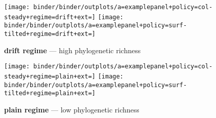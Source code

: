 
\begin{figure*}
  \centering

\begin{subfigure}[b]{\textwidth}
\centering
\texttt{[image: binder/binder/outplots/a=examplepanel+policy=col-steady+regime=drift+ext=]}%
\texttt{[image: binder/binder/outplots/a=examplepanel+policy=surf-tilted+regime=drift+ext=]}
\caption{\textbf{drift regime} --- high phylogenetic richness}
\label{fig:examplepanel-drift}
\end{subfigure}

\begin{subfigure}[b]{\textwidth}
\centering
\texttt{[image: binder/binder/outplots/a=examplepanel+policy=col-steady+regime=plain+ext=]}%
\texttt{[image: binder/binder/outplots/a=examplepanel+policy=surf-tilted+regime=plain+ext=]}
\caption{\textbf{plain regime} --- low phylogenetic richness}
\label{fig:examplepanel-plain}
\end{subfigure}

  \caption{%
  \textbf{Reconstruction vs. Reference Examples.}
  Comparison of reconstruction to reference tree for steady and tilted policies under drift (\ref{fig:examplepanel-drift}) and plain (\ref{fig:examplepanel-plain}) evolutionary regimes.
  Panel tops show reconstruction quality metrics and panel bottoms overlay reconstruction (blue) on reference tree (orange).
  Phylogeny time axes are log scale.
  Note that overlay layout is naive, so can underrepresent agreement between trees; however, comparison is informative to general differences in tree structure.
  }
  \label{fig:examplepanel}

\end{figure*}
